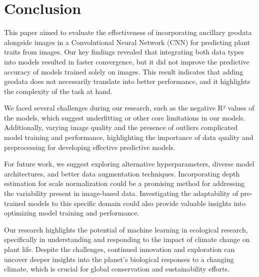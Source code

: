 \documentclass[12pt,a4paper,oneside]{article}
\begin{document}
\newpage
\section{Conclusion}

This paper aimed to evaluate the effectiveness of incorporating ancillary geodata alongside images in a Convolutional Neural Network (CNN) for predicting plant traits from images. Our key findings revealed that integrating both data types into models resulted in faster convergence, but it did not improve the predictive accuracy of models trained solely on images. This result indicates that adding geodata does not necessarily translate into better performance, and it highlights the complexity of the task at hand.

We faced several challenges during our research, such as the negative R² values of the models, which suggest underfitting or other core limitations in our models. Additionally, varying image quality and the presence of outliers complicated model training and performance, highlighting the importance of data quality and preprocessing for developing effective predictive models. 

For future work, we suggest exploring alternative hyperparameters, diverse model architectures, and better data augmentation techniques. Incorporating depth estimation for scale normalization could be a promising method for addressing the variability present in image-based data. Investigating the adaptability of pre-trained models to this specific domain could also provide valuable insights into optimizing model training and performance.

Our research highlights the potential of machine learning in ecological research, specifically in understanding and responding to the impact of climate change on plant life. Despite the challenges, continued innovation and exploration can uncover deeper insights into the planet's biological responses to a changing climate, which is crucial for global conservation and sustainability efforts.

\printbibliography



\end{document}
